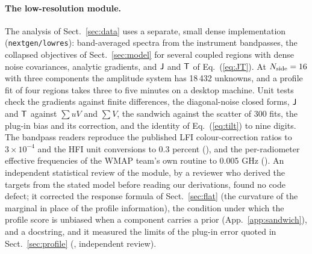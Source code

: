 \paragraph{The low-resolution module.} The analysis of Sect.~\ref{sec:data} uses a separate, small
dense implementation (\texttt{nextgen/lowres}): band-averaged spectra from the instrument
bandpasses, the collapsed objectives of Sect.~\ref{sec:model} for several coupled regions with dense
noise covariances, analytic gradients, and $\mathsf{J}$ and $\mathsf{T}$ of Eq.~(\ref{eq:JT}). At
$N_{\rm side} = 16$ with three components the amplitude system has 18\,432 unknowns, and a profile fit
of four regions takes three to five minutes on a desktop machine. Unit tests
check the gradients against finite differences, the diagonal-noise closed forms, $\mathsf{J}$ and $\mathsf{T}$
against $\sum u V$ and $\sum V$, the sandwich against the scatter of 300 fits, the plug-in bias and
its correction, and the identity of Eq.~(\ref{eq:tilt}) to nine digits. The bandpass readers
reproduce the published LFI colour-correction ratios to $3\times10^{-4}$ and the HFI unit conversions
to 0.3 percent (), and the per-radiometer effective frequencies of the WMAP team's own
routine to 0.005 GHz (). An independent statistical review of the module, by a reviewer who derived the targets from the
stated model before reading our derivations, found no code defect; it corrected the response formula
of Sect.~\ref{sec:flat} (the curvature of the marginal in place of the profile information), the
condition under which the profile score is unbiased when a component carries a prior
(App.~\ref{app:sandwich}), and a docstring, and it measured the limits of the plug-in error quoted in
Sect.~\ref{sec:profile} (, independent review).

